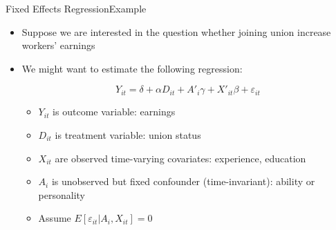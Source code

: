 \documentclass[dvipsnames,hyperref={pdfpagelabels=false}]{beamer}
\begin{document}
\begin{frame}{Fixed Effects Regression}{Example}
	\begin{itemize} 
		\item Suppose we are interested in the question whether 
		joining union increase workers' earnings
		\vspace{0.2cm}
		\item We might want to estimate the following regression:
	
		\begin{equation*}
		Y_{it}=\delta+\alpha D_{it}+A'_i\gamma+X'_{it}\beta + \varepsilon_{it}
	\end{equation*}
	
		\begin{itemize} 
		\item $Y_{it}$ is outcome variable: earnings
				\vspace{0.2cm}
		\item $D_{it}$ is treatment variable: union status
					\vspace{0.2cm}
		\item $X_{it}$ are 	observed time-varying covariates: experience, education  
							\vspace{0.2cm}
		\item $A_i$	is unobserved but fixed confounder (time-invariant): ability or personality
		\vspace{0.2cm}
		\item Assume $E[\varepsilon_{it}|A_i,X_{it}]=0$				
			\end{itemize}	
	\end{itemize}
\end{frame}
\end{document}
